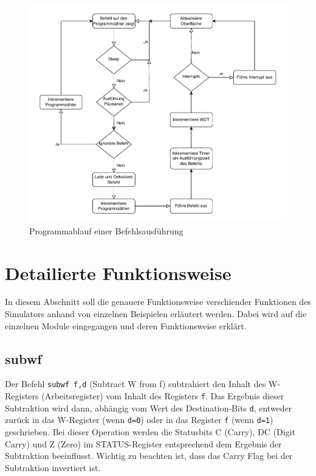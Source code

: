 \begin{figure}[H]
    \centering
    \includegraphics[width=\textwidth]{./img/excec_cycle.drawio.pdf}
    \caption{Programmablauf einer Befehlsausführung}
    \label{fig:execTask}
\end{figure}

\section{Detailierte Funktionsweise}
In diesem Abschnitt soll die genauere Funktionsweise verschiender Funktionen des Simulators anhand von einzelnen Beispielen erläutert werden. Dabei wird auf die einzelnen Module eingegangen und deren Funktionsweise erklärt.

\subsection{subwf}
Der Befehl \texttt{subwf f,d} (Subtract W from f) subtrahiert den Inhalt des W-Registers (Arbeitsregister) vom Inhalt des Registers \texttt{f}. Das Ergebnis dieser Subtraktion wird dann, abhängig vom Wert des Destination-Bits \texttt{d}, entweder zurück in das W-Register (wenn \texttt{d=0}) oder in das Register \texttt{f} (wenn \texttt{d=1}) geschrieben. Bei dieser Operation werden die Statusbits C (Carry), DC (Digit Carry) und Z (Zero) im STATUS-Register entsprechend dem Ergebnis der Subtraktion beeinflusst. Wichtig zu beachten ist, dass das Carry Flag bei der Subtraktion invertiert ist.


